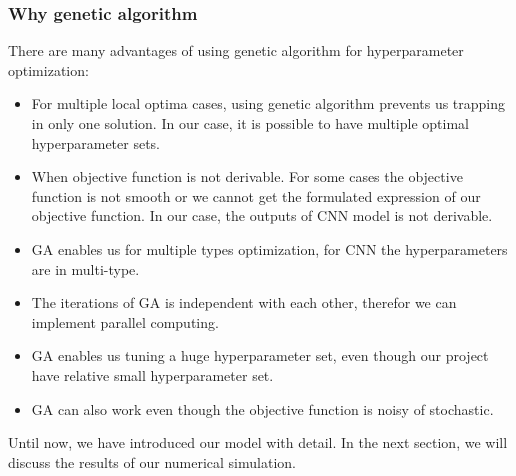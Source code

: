 \documentclass[12pt]{article}
\begin{document}
\subsubsection{Why genetic algorithm}
There are many advantages of using genetic algorithm for hyperparameter optimization:
\begin{itemize}
\item For multiple local optima cases, using genetic algorithm prevents us trapping in only one solution. In our case, it is possible to have multiple optimal hyperparameter sets.
\item When objective function is not derivable. For some cases the objective function is not smooth or we cannot get the formulated expression of our objective function. In our case, the outputs of CNN model is not derivable.
\item GA enables us for multiple types optimization, for CNN the hyperparameters are in multi-type.
\item The iterations of GA is independent with each other, therefor we can implement parallel computing.
\item GA enables us tuning a huge hyperparameter set, even though our project have relative small hyperparameter set.
\item GA can also work even though the objective function is noisy of stochastic.
\end{itemize}
Until now, we have introduced our model with detail. In the next section, we will discuss the results of our numerical simulation.
\end{document}
